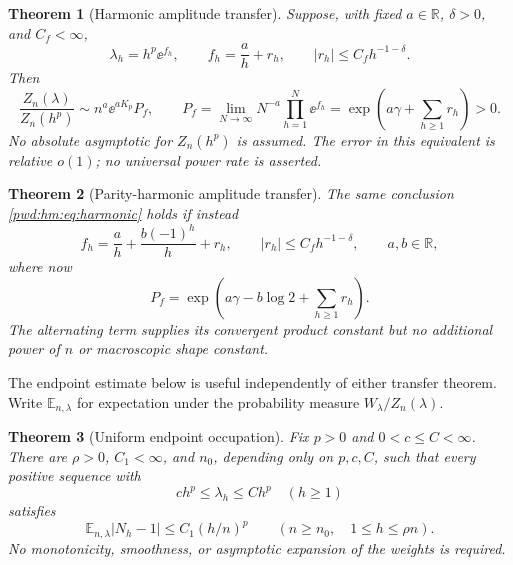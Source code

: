 \documentclass[11pt,letterpaper]{article}
\numberwithin{equation}{section}
\newtheorem{theorem}{Theorem}[section]
\theoremstyle{remark}\newtheorem{remark}[theorem]{Remark}
\newcommand{\E}{\mathbb E}\newcommand{\Prob}{\mathbb P}
\begin{document}
\begin{theorem}[Harmonic amplitude transfer]\label{pwd:hm:thm:harmonic}
Suppose, with fixed $a\in\mathbb R$, $\delta>0$, and $C_f<\infty$,
\[
 \lambda_h=h^p\ee^{f_h},\qquad f_h=\frac ah+r_h,\qquad
 |r_h|\le C_fh^{-1-\delta}.
\]
Then
\begin{equation}\label{pwd:hm:eq:harmonic}
 \frac{Z_n(\lambda)}{Z_n(h^p)}\sim n^a\ee^{aK_p}P_f,
 \qquad
 P_f=\lim_{N\to\infty}N^{-a}\prod_{h=1}^N\ee^{f_h}
 =\exp\left(a\gamma+\sum_{h\ge1}r_h\right)>0.
\end{equation}
No absolute asymptotic for $Z_n(h^p)$ is assumed. The error in this equivalent is relative $o(1)$; no universal power rate is asserted.
\end{theorem}

\begin{theorem}[Parity-harmonic amplitude transfer]\label{pwd:hm:thm:parity}
The same conclusion \eqref{pwd:hm:eq:harmonic} holds if instead
\begin{equation}\label{pwd:hm:eq:parity-assumption}
 f_h=\frac ah+\frac{b(-1)^h}{h}+r_h,\qquad
 |r_h|\le C_fh^{-1-\delta},\qquad a,b\in\mathbb R,
\end{equation}
where now
\begin{equation}\label{pwd:hm:eq:parity-product}
 P_f=\exp\left(a\gamma-b\log2+\sum_{h\ge1}r_h\right).
\end{equation}
The alternating term supplies its convergent product constant but no additional power of $n$ or macroscopic shape constant.
\end{theorem}

The endpoint estimate below is useful independently of either transfer theorem. Write $\E_{n,\lambda}$ for expectation under the probability measure $W_\lambda/Z_n(\lambda)$.
\begin{theorem}[Uniform endpoint occupation]\label{pwd:hm:thm:endpoint}
Fix $p>0$ and $0<c\le C<\infty$. There are $\rho>0$, $C_1<\infty$, and $n_0$, depending only on $p,c,C$, such that every positive sequence with
\begin{equation}\label{pwd:hm:eq:powerclass}
 ch^p\le\lambda_h\le Ch^p\quad(h\ge1)
\end{equation}
satisfies
\begin{equation}\label{pwd:hm:eq:endpoint}
 \E_{n,\lambda}|N_h-1|\le C_1(h/n)^p
 \qquad(n\ge n_0,\quad1\le h\le\rho n).
\end{equation}
No monotonicity, smoothness, or asymptotic expansion of the weights is required.
\end{theorem}
\end{document}
